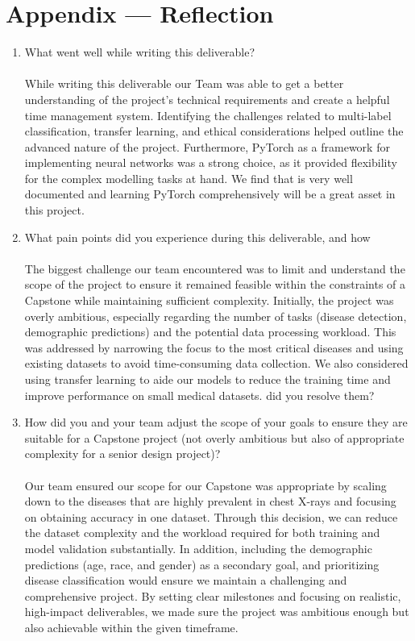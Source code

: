 \documentclass{article}
\begin{document}
\newpage{}

\section*{Appendix --- Reflection}


\begin{enumerate}
    \item What went well while writing this deliverable? \\\\
While writing this deliverable our Team was able to get a better understanding of the project’s technical requirements and create a helpful time management system. Identifying the challenges related to multi-label classification, transfer learning, and ethical considerations helped outline the advanced nature of the project. Furthermore, PyTorch as a framework for implementing neural networks was a strong choice, as it provided flexibility for the complex modelling tasks at hand. We find that is very well documented and learning PyTorch comprehensively will be a great asset in this project.  
    \item What pain points did you experience during this deliverable, and how \\\\
    The biggest challenge our team encountered was to limit and understand the scope of the project to ensure it remained feasible within the constraints of a Capstone while maintaining sufficient complexity. Initially, the project was overly ambitious, especially regarding the number of tasks (disease detection, demographic predictions) and the potential data processing workload. This was addressed by narrowing the focus to the most critical diseases and using existing datasets to avoid time-consuming data collection. We also considered using transfer learning to aide our models to reduce the training time and improve performance on small medical datasets.
    did you resolve them?
    \item How did you and your team adjust the scope of your goals to ensure
    they are suitable for a Capstone project (not overly ambitious but also of
    appropriate complexity for a senior design project)? \\\\
    Our team ensured our scope for our Capstone was appropriate by scaling down to the diseases that are highly prevalent in chest X-rays and focusing on obtaining accuracy in one dataset. Through this decision, we can reduce the dataset complexity and the workload required for both training and model validation substantially. In addition, including the demographic predictions (age, race, and gender) as a secondary goal, and prioritizing disease classification would ensure we maintain a challenging and comprehensive project. By setting clear milestones and focusing on realistic, high-impact deliverables, we made sure the project was ambitious enough but also achievable within the given timeframe.
\end{enumerate}  
\end{document}
